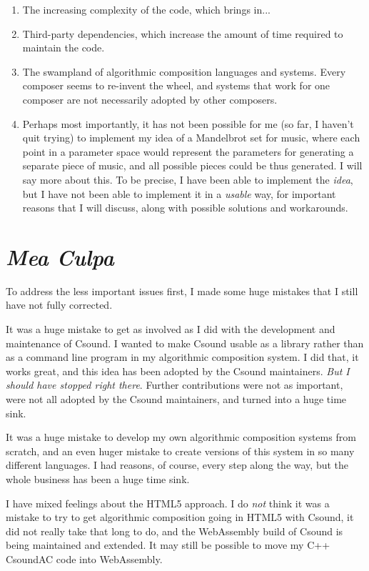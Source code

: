 \documentclass[a4paper,10pt]{scrartcl}
\begin{document}
\begin{enumerate}
 \item The increasing complexity of the code, which brings in...
 \item Third-party dependencies, which increase the amount of time required to 
maintain the code.
 \item The swampland of algorithmic composition languages and systems. Every 
composer seems to re-invent the wheel, and systems that work for one composer 
are not necessarily adopted by other composers.
 \item Perhaps most importantly, it has not been possible for me (so far, I 
haven't quit trying) to implement my idea of a Mandelbrot set for music, where 
each point in a parameter space would represent the parameters for generating 
a separate piece of music, and all possible pieces could be thus generated. I 
will say more about this. To be precise, I have been able to implement the 
\emph{idea}, but I have not been able to implement it in a \emph{usable} way, 
for important reasons that I will discuss, along with possible solutions and 
workarounds.
\end{enumerate}

\section*{\emph{Mea Culpa}}

To address the less important issues first, I made some huge mistakes that I 
still have not fully corrected.

It was a huge mistake to get as involved as I did with the development and 
maintenance of Csound. I wanted to make Csound usable as a library rather than 
as a command line program in my algorithmic composition system. I did that, 
it works great, and this idea has been adopted by the Csound maintainers. 
\emph{But I should have stopped right there}. Further contributions were not 
as important, were not all adopted by the Csound maintainers, and turned into 
a huge time sink.

It was a huge mistake to develop my own algorithmic composition systems from 
scratch, and an even huger mistake to create versions of this system in so 
many different languages. I had reasons, of course, every step along the way, 
but the whole business has been a huge time sink.

I have mixed feelings about the HTML5 approach. I do \emph{not} think it was a 
mistake to try to get algorithmic composition going in HTML5 with Csound,  
it did not really take that long to do, and the WebAssembly build of Csound is 
being maintained and extended. It may still be possible to move my C++ 
CsoundAC code into WebAssembly. 
\end{document}
